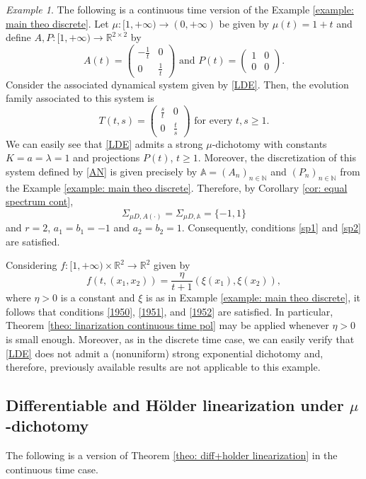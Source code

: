 \documentclass[reqno, a4paper, 10pt]{amsart}
\theoremstyle{plain}
\numberwithin{equation}{section}
\theoremstyle{remark}
\newtheorem{example}{Example}
\def\N{\mathbb{N}}
\def\R{\mathbb{R}}
\begin{document}
\begin{example} The following is a continuous time version of the Example \ref{example: main theo discrete}. Let $\mu \colon [1,+\infty)\to (0,+\infty)$ be given by $\mu(t)=1+t$ and define $A,P\colon [1,+\infty)\to \R^{2\times 2}$ by
\[
A(t)=\begin{pmatrix}
-\frac{1}{t} & 0\\
0 & \frac{1}{t}
\end{pmatrix} \text{ and } P(t)=\begin{pmatrix}
1 & 0\\
0 & 0
\end{pmatrix}.
\]
Consider the associated dynamical system given by \eqref{LDE}. Then, the evolution family associated to this system is
\[
T(t,s)=\begin{pmatrix}
\frac{s}{t} & 0\\
0 & \frac{t}{s}
\end{pmatrix} \text{ for every } t,s\geq 1.
\]
We can easily see that \eqref{LDE} admits a strong $\mu$-dichotomy with constants $K=a=\lambda=1$ and projections $P(t)$, $t\geq 1$. Moreover, the discretization of this system defined by \eqref{AN} is given precisely by $\mathbb{A}=(A_n)_{n\in \N}$ and $(P_n)_{n\in \N}$ from the Example \ref{example: main theo discrete}. Therefore, by Corollary \ref{cor: equal spectrum cont}, 
\[
\Sigma_{\mu D,A(\cdot)}=\Sigma_{\mu D,\mathbb{A}}=\{-1,1\}
\] 
and $r=2$, $a_1=b_1=-1$ and $a_2=b_2=1$. Consequently, conditions \eqref{sp1} and \eqref{sp2} are satisfied. 

Considering $f:[1,+\infty)\times \R^2\to \R^2$ given by
\[f(t,(x_1,x_2))=\frac{\eta}{t+1}(\xi(x_1),\xi(x_2)),\]
where $\eta>0$ is a constant and $\xi$ is as in Example \ref{example: main theo discrete}, it follows that conditions \eqref{1950}, \eqref{1951}, and \eqref{1952} are satisfied. In particular, Theorem \ref{theo: linarization continuous time pol} may be applied whenever $\eta>0$ is small enough. Moreover, as in the discrete time case, we can easily verify that \eqref{LDE} does not admit a (nonuniform) strong exponential dichotomy and, therefore, previously available results are not applicable to this example.
\end{example}



\subsection{Differentiable and H\"older linearization under $\mu$-dichotomy} The following is a version of Theorem \ref{theo: diff+holder linearization} in the continuous time case. 
\end{document}
